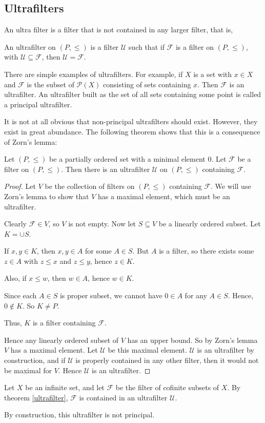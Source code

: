 \subsection{Ultrafilters}
An ultra filter is a filter that is not contained in any larger
filter, that is,
\begin{definition}
    An ultrafilter on $(P,\leq)$ is a filter $\mathcal{U}$
    such that if $\mathcal{F}$ is a filter on $(P,\leq)$, 
    with $\mathcal{U} \subseteq \mathcal{F}$, then $\mathcal{U} = \mathcal{F}$.
\end{definition}

There are simple examples of ultrafilters. For example, if $X$
is a set with $x \in X$ and $\mathcal{F}$ is the subset of $\mathcal{P}(X)$
consisting of sets containing $x$. Then $\mathcal{F}$ is an ultrafilter.
An ultrafilter built as the set of all sets containing some point is called
a principal ultrafilter.

It is not at all obvious that non-principal ultrafilters should exist. However,
they exist in great abundance. The following theorem
shows that this is a consequence of Zorn's lemma:
\begin{theorem}
\label{ultrafilter}
    Let $(P,\leq)$ be a partially ordered set with a minimal element $0$. Let
    $\mathcal{F}$ be a filter on $(P,\leq)$. Then there is an ultrafilter 
    $\mathcal{U}$ on $(P,\leq)$ containing $\mathcal{F}$.
\end{theorem}
\begin{proof}
    Let $V$ be the collection of filters on $(P,\leq)$ containing $\mathcal{F}$.
    We will use Zorn's lemma to show that $V$ has a maximal element, which must
    be an ultrafilter.

    Clearly $\mathcal{F} \in V$, so $V$ is not empty. Now let $S \subseteq V$
    be a linearly ordered subset. Let $K = \cup S$. 

    If $x,y \in K$, then $x,y \in A$ for some $A \in S$. But
    $A$ is a filter, so there exists some $z \in A$ with $z \leq x$ and $z \leq y$,
    hence $z \in K$.

    Also, if $x \leq w$, then $w \in A$, hence $w \in K$.

    Since each $A \in S$ is proper subset, we cannot have $0 \in A$ for any $A \in S$.
    Hence, $0 \notin K$. So $K \neq P$.

    Thus, $K$ is a filter containing $\mathcal{F}$. 

    Hence any linearly ordered subset of $V$ has an upper bound. So by Zorn's lemma
    $V$ has a maximal element. Let $\mathcal{U}$
    be this maximal element. $\mathcal{U}$ is an ultrafilter by construction,
    and if $\mathcal{U}$ is properly contained in any other filter, then it would not
    be maximal for $V$. Hence $\mathcal{U}$ is an ultrafilter.
\end{proof}
\begin{example}
    Let $X$ be an infinite set, and let $\mathcal{F}$ be the filter
    of cofinite subsets of $X$. By theorem \ref{ultrafilter},
    $\mathcal{F}$ is contained in an ultrafilter $\mathcal{U}$.

    By construction, this ultrafilter is not principal.
\end{example}

